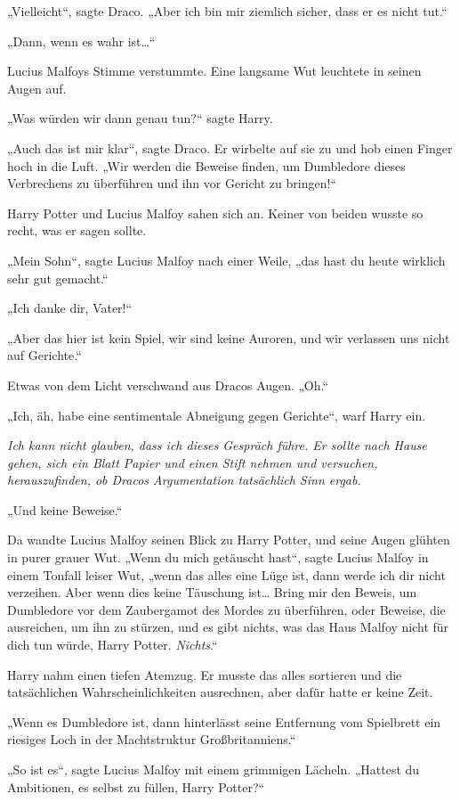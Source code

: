 {„Vielleicht“, sagte Draco. „Aber ich bin mir ziemlich sicher, dass er es nicht tut.“

„Dann, wenn es wahr ist…“

Lucius Malfoys Stimme verstummte. Eine langsame Wut leuchtete in seinen Augen auf.

„Was würden wir dann genau tun?“ sagte Harry.

„Auch das ist mir klar“, sagte Draco. Er wirbelte auf sie zu und hob einen Finger hoch in die Luft. „Wir werden die Beweise finden, um Dumbledore dieses Verbrechens zu überführen und ihn vor Gericht zu bringen!“

Harry Potter und Lucius Malfoy sahen sich an. Keiner von beiden wusste so recht, was er sagen sollte.

„Mein Sohn“, sagte Lucius Malfoy nach einer Weile, „das hast du heute wirklich sehr gut gemacht.“

„Ich danke dir, Vater!“

„Aber das hier ist kein Spiel, wir sind keine Auroren, und wir verlassen uns nicht auf Gerichte.“

Etwas von dem Licht verschwand aus Dracos Augen. „Oh.“

„Ich, äh, habe eine sentimentale Abneigung gegen Gerichte“, warf Harry ein.

\emph{Ich kann nicht glauben, dass ich dieses Gespräch führe. Er sollte nach Hause gehen, sich ein Blatt Papier und einen Stift nehmen und versuchen, herauszufinden, ob Dracos Argumentation tatsächlich Sinn ergab.}

„Und keine Beweise.“

Da wandte Lucius Malfoy seinen Blick zu Harry Potter, und seine Augen glühten in purer grauer Wut. „Wenn du mich getäuscht hast“, sagte Lucius Malfoy in einem Tonfall leiser Wut, „wenn das alles eine Lüge ist, dann werde ich dir nicht verzeihen. Aber wenn dies keine Täuschung ist… Bring mir den Beweis, um Dumbledore vor dem Zaubergamot des Mordes zu überführen, oder Beweise, die ausreichen, um ihn zu stürzen, und es gibt nichts, was das Haus Malfoy nicht für dich tun würde, Harry Potter. \emph{Nichts}.“

Harry nahm einen tiefen Atemzug. Er musste das alles sortieren und die tatsächlichen Wahrscheinlichkeiten ausrechnen, aber dafür hatte er keine Zeit.

„Wenn es Dumbledore ist, dann hinterlässt seine Entfernung vom Spielbrett ein riesiges Loch in der Machtstruktur Großbritanniens.“

„So ist es“, sagte Lucius Malfoy mit einem grimmigen Lächeln. „Hattest du Ambitionen, es selbst zu füllen, Harry Potter?“

}
